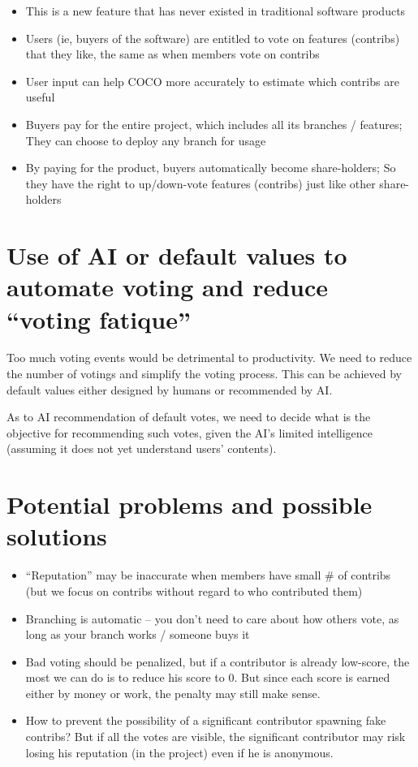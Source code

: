 \documentclass[12pt, orivec]{article}
\begin{document}
\begin{itemize}
	\item This is a new feature that has never existed in traditional software products
	
	\item Users (ie, buyers of the software) are entitled to vote on features (contribs) that they like, the same as when members vote on contribs
	
	\item User input can help COCO more accurately to estimate which contribs are useful

	\item Buyers pay for the entire project, which includes all its branches / features;  They can choose to deploy any branch for usage

	\item By paying for the product, buyers automatically become share-holders;  So they have the right to up/down-vote features (contribs) just like other share-holders
\end{itemize}

\secttoc
\section{Use of AI or default values to automate voting and reduce ``voting fatique''}

Too much voting events would be detrimental to productivity.  We need to reduce the number of votings and simplify the voting process.  This can be achieved by default values either designed by humans or recommended by AI.

As to AI recommendation of default votes, we need to decide what is the objective for recommending such votes, given the AI's limited intelligence (assuming it does not yet understand users' contents).

\secttoc
\section{Potential problems and possible solutions}

\begin{itemize}
	\item ``Reputation'' may be inaccurate when members have small \# of contribs (but we focus on contribs without regard to who contributed them)
	
	\item Branching is automatic -- you don't need to care about how others vote, as long as your branch works / someone buys it
	
	\item Bad voting should be penalized, but if a contributor is already low-score, the most we can do is to reduce his score to 0.  But since each score is earned either by money or work, the penalty may still make sense.
	
	\item How to prevent the possibility of a significant contributor spawning fake contribs?  But if all the votes are visible, the significant contributor may risk losing his reputation (in the project) even if he is anonymous.
\end{itemize}
\end{document}
